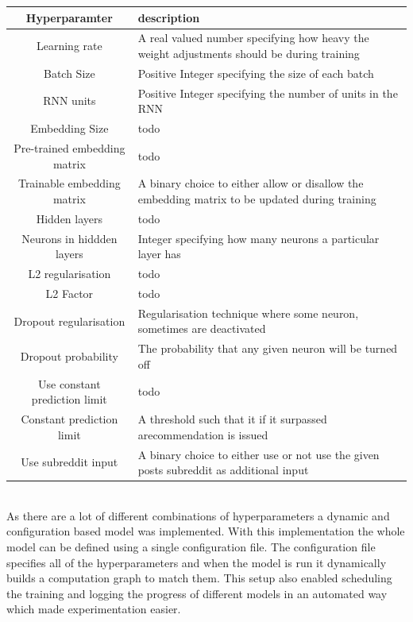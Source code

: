 \begin{center}
\begin{tabular}{| c | p{7cm} |}
    \hline
    Hyperparamter  &  description \\ \hline
    Learning rate & A real valued number specifying how heavy the weight adjustments should be during training  \\ \hline
    Batch Size & Positive Integer specifying the size of each batch \\ \hline
    RNN units & Positive Integer specifying the number of units in the RNN  \\ \hline
    Embedding Size & todo \\ \hline
    Pre-trained embedding matrix & todo \\ \hline
    Trainable embedding matrix & A binary choice to either allow or disallow the embedding matrix to be updated during training \\ \hline
    Hidden layers & todo \\ \hline
    Neurons in hiddden layers & Integer specifying how many neurons a particular layer has \\ \hline
    L2 regularisation & todo \\ \hline
    L2 Factor & todo \\ \hline
    Dropout regularisation& Regularisation technique where some neuron, sometimes are deactivated \\ \hline
    Dropout probability & The probability that any given neuron will be turned off \\ \hline
    Use constant prediction limit & todo \\ \hline
    Constant prediction limit & A threshold such that it if it surpassed arecommendation is issued  \\ \hline
    Use subreddit input & A binary choice to either use or not use the given posts subreddit as additional input \\ \hline
\end{tabular}
\end{center}
\\
As there are a lot of different combinations of hyperparameters a dynamic and configuration based model was implemented. With this implementation the whole model can be defined using a single configuration file. The configuration file specifies all of the hyperparameters and when the model is run it dynamically builds a computation graph to match them. This setup also enabled scheduling the training and logging the progress of different models in an automated way which made experimentation easier.
